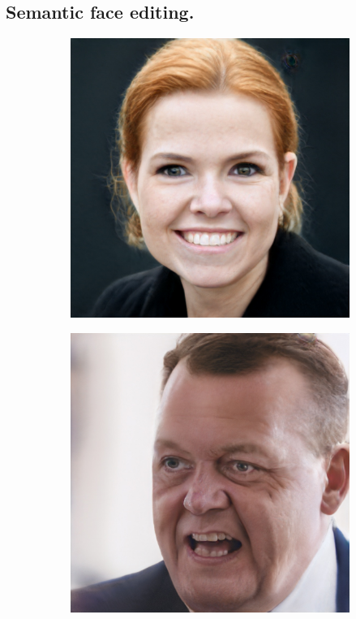 \subsection{Semantic face editing.}

\begin{figure}
    \centering
    \begin{subfigure}[b]{0.24\textwidth}
        \includegraphics[width=\textwidth]{fig/stylegan/faceedit/inger-smile}
    \end{subfigure}
    \begin{subfigure}[b]{0.24\textwidth}
        \includegraphics[width=\textwidth]{fig/stylegan/faceedit/lars-smile}

\end{subfigure}
\end{figure}
